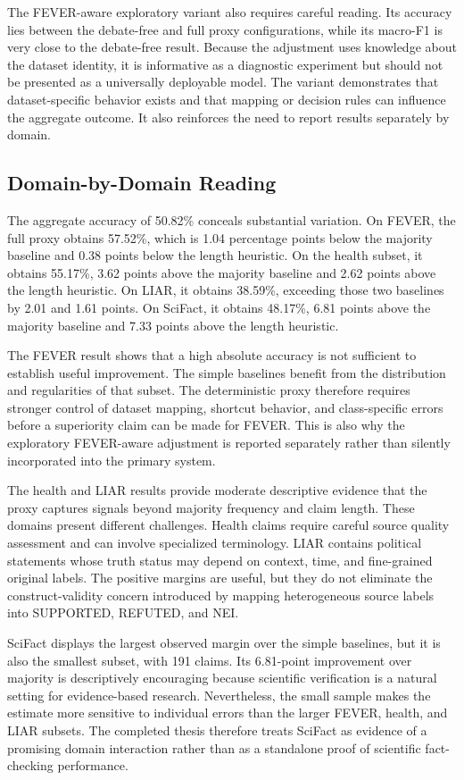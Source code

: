\documentclass[12pt,a4paper,openany]{report}
\begin{document}
The FEVER-aware exploratory variant also requires careful reading. Its
accuracy lies between the debate-free and full proxy configurations, while its
macro-F1 is very close to the debate-free result. Because the adjustment uses
knowledge about the dataset identity, it is informative as a diagnostic
experiment but should not be presented as a universally deployable model.
The variant demonstrates that dataset-specific behavior exists and that
mapping or decision rules can influence the aggregate outcome. It also
reinforces the need to report results separately by domain.

\subsection{Domain-by-Domain Reading}
The aggregate accuracy of 50.82\% conceals substantial variation. On FEVER,
the full proxy obtains 57.52\%, which is 1.04 percentage points below the
majority baseline and 0.38 points below the length heuristic. On the health
subset, it obtains 55.17\%, 3.62 points above the majority baseline and 2.62
points above the length heuristic. On LIAR, it obtains 38.59\%, exceeding
those two baselines by 2.01 and 1.61 points. On SciFact, it obtains 48.17\%,
6.81 points above the majority baseline and 7.33 points above the length
heuristic.

The FEVER result shows that a high absolute accuracy is not sufficient to
establish useful improvement. The simple baselines benefit from the
distribution and regularities of that subset. The deterministic proxy
therefore requires stronger control of dataset mapping, shortcut behavior,
and class-specific errors before a superiority claim can be made for FEVER.
This is also why the exploratory FEVER-aware adjustment is reported
separately rather than silently incorporated into the primary system.

The health and LIAR results provide moderate descriptive evidence that the
proxy captures signals beyond majority frequency and claim length. These
domains present different challenges. Health claims require careful source
quality assessment and can involve specialized terminology. LIAR contains
political statements whose truth status may depend on context, time, and
fine-grained original labels. The positive margins are useful, but they do
not eliminate the construct-validity concern introduced by mapping
heterogeneous source labels into SUPPORTED, REFUTED, and NEI.

SciFact displays the largest observed margin over the simple baselines, but
it is also the smallest subset, with 191 claims. Its 6.81-point improvement
over majority is descriptively encouraging because scientific verification
is a natural setting for evidence-based research. Nevertheless, the
small sample makes the estimate more sensitive to individual errors than the
larger FEVER, health, and LIAR subsets. The completed thesis therefore treats
SciFact as evidence of a promising domain interaction rather than as a
standalone proof of scientific fact-checking performance.
\end{document}

